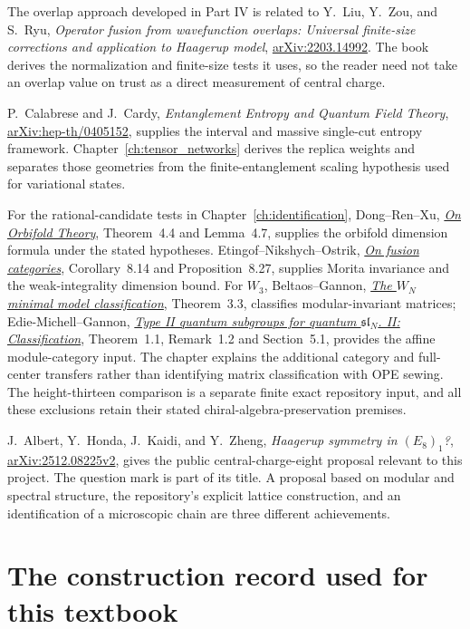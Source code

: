 The overlap approach developed in Part IV is related to
Y.~Liu, Y.~Zou, and S.~Ryu,
\emph{Operator fusion from wavefunction overlaps: Universal
finite-size corrections and application to Haagerup model},
\href{https://arxiv.org/abs/2203.14992}{arXiv:2203.14992}.
The book derives the normalization and finite-size tests it
uses, so the reader need not take an overlap value on trust
as a direct measurement of central charge.

P.~Calabrese and J.~Cardy,
\emph{Entanglement Entropy and Quantum Field Theory},
\href{https://arxiv.org/abs/hep-th/0405152}{arXiv:hep-th/0405152},
supplies the interval and massive single-cut entropy framework.
Chapter~\ref{ch:tensor_networks} derives the replica weights and
separates those geometries from the finite-entanglement scaling
hypothesis used for variational states.

For the rational-candidate tests in Chapter~\ref{ch:identification},
Dong--Ren--Xu, \href{https://arxiv.org/abs/1507.03306}
{\emph{On Orbifold Theory}}, Theorem~4.4 and Lemma~4.7, supplies
the orbifold dimension formula under the stated hypotheses.
Etingof--Nikshych--Ostrik, \href{https://arxiv.org/abs/math/0203060}
{\emph{On fusion categories}}, Corollary~8.14 and Proposition~8.27,
supplies Morita invariance and the weak-integrality dimension bound.
For $W_3$, Beltaos--Gannon, \href{https://arxiv.org/abs/1004.1205}
{\emph{The $W_N$ minimal model classification}}, Theorem~3.3,
classifies modular-invariant matrices; Edie-Michell--Gannon,
\href{https://arxiv.org/abs/2408.02794}
{\emph{Type II quantum subgroups for quantum $\mathfrak{sl}_N$.
II: Classification}}, Theorem~1.1, Remark~1.2 and Section~5.1,
provides the affine module-category input. The chapter explains the
additional category and full-center transfers rather than identifying
matrix classification with OPE sewing. The height-thirteen comparison
is a separate finite exact repository input, and all these exclusions
retain their stated chiral-algebra-preservation premises.

J.~Albert, Y.~Honda, J.~Kaidi, and Y.~Zheng,
\emph{Haagerup symmetry in $(E_8)_1$?},
\href{https://arxiv.org/abs/2512.08225v2}{arXiv:2512.08225v2},
gives the public central-charge-eight proposal relevant to this
project. The question mark is part of its title. A proposal
based on modular and spectral structure, the repository's
explicit lattice construction, and an identification of a
microscopic chain are three different achievements.

\section*{The construction record used for this textbook}

